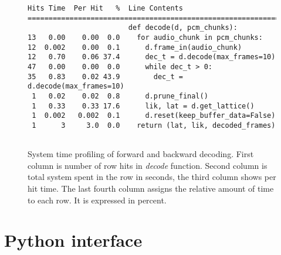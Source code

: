 \begin{figure}[!htp]
    \begin{center}
    \begin{verbatim}
Hits Time  Per Hit   %  Line Contents
==============================================================
                        def decode(d, pcm_chunks):
13   0.00    0.00  0.0    for audio_chunk in pcm_chunks:
12  0.002    0.00  0.1      d.frame_in(audio_chunk)
12   0.70    0.06 37.4      dec_t = d.decode(max_frames=10)
47   0.00    0.00  0.0      while dec_t > 0:
35   0.83    0.02 43.9        dec_t = d.decode(max_frames=10)
 1   0.02    0.02  0.8      d.prune_final()
 1   0.33    0.33 17.6      lik, lat = d.get_lattice()
 1  0.002   0.002  0.1      d.reset(keep_buffer_data=False)
 1      3     3.0  0.0    return (lat, lik, decoded_frames)
        
    \end{verbatim}
    \caption{System time profiling of forward and backward decoding.
First column is number of row hits in {\it decode}\/ function. Second column
is total system spent in the row in seconds, the third column shows per hit time. 
The last fourth column assigns the relative amount of time to each row. 
It is expressed in percent.}
    \label{fig:cpu_profile} 
    \end{center}
\end{figure}


\section{Python interface} 
\label{sec:python_c_interface}

